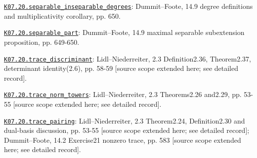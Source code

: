 \par\smallskip\noindent\hypertarget{src:K07.20.separable_inseparable_degrees}{}\label{src:K07.20.separable_inseparable_degrees}\hyperref[K07.20.separable_inseparable_degrees]{\texttt{K07.20.separable\_inseparable\_degrees}}: Dummit--Foote, 14.9 degree definitions and multiplicativity corollary, pp. 650.
\par\smallskip\noindent\hypertarget{src:K07.20.separable_part}{}\label{src:K07.20.separable_part}\hyperref[K07.20.separable_part]{\texttt{K07.20.separable\_part}}: Dummit--Foote, 14.9 maximal separable subextension proposition, pp. 649-650.
\par\smallskip\noindent\hypertarget{src:K07.20.trace_discriminant}{}\label{src:K07.20.trace_discriminant}\hyperref[K07.20.trace_discriminant]{\texttt{K07.20.trace\_discriminant}}: Lidl--Niederreiter, 2.3 Definition2.36, Theorem2.37, determinant identity(2.6), pp. 58-59 [source scope extended here; see detailed record].
\par\smallskip\noindent\hypertarget{src:K07.20.trace_norm_towers}{}\label{src:K07.20.trace_norm_towers}\hyperref[K07.20.trace_norm_towers]{\texttt{K07.20.trace\_norm\_towers}}: Lidl--Niederreiter, 2.3 Theorems2.26 and2.29, pp. 53-55 [source scope extended here; see detailed record].
\par\smallskip\noindent\hypertarget{src:K07.20.trace_pairing}{}\label{src:K07.20.trace_pairing}\hyperref[K07.20.trace_pairing]{\texttt{K07.20.trace\_pairing}}: Lidl--Niederreiter, 2.3 Theorem2.24, Definition2.30 and dual-basis discussion, pp. 53-55 [source scope extended here; see detailed record]; Dummit--Foote, 14.2 Exercise21 nonzero trace, pp. 583 [source scope extended here; see detailed record].
